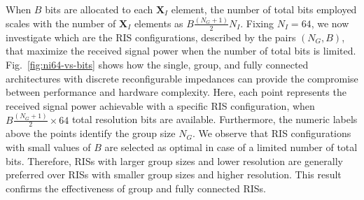 \documentclass[twocolumn,10pt]{IEEEtran}
\begin{document}
When $B$ bits are allocated to each $\mathbf{X}_{I}$ element, the number of total bits employed scales with the number of $\mathbf{X}_{I}$ elements as $B\frac{\left(N_{G}+1\right)}{2}N_{I}$.
Fixing $N_{I}=64$, we now investigate which are the RIS configurations, described by the pairs $(N_{G},B)$, that maximize the received signal power when the number of total bits is limited.
Fig.~\ref{fig:ni64-vs-bits} shows how the single, group, and fully connected architectures with discrete reconfigurable impedances can provide the compromise between performance and hardware complexity.
Here, each point represents the received signal power achievable with a specific RIS configuration, when $B\frac{\left(N_{G}+1\right)}{2}\times 64$ total resolution bits are available.
Furthermore, the numeric labels above the points identify the group size $N_{G}$.
We observe that RIS configurations with small values of $B$ are selected as optimal in case of a limited number of total bits.
Therefore, RISs with larger group sizes and lower resolution are generally preferred over RISs with smaller group sizes and higher resolution.
This result confirms the effectiveness of group and fully connected RISs.
\end{document}

